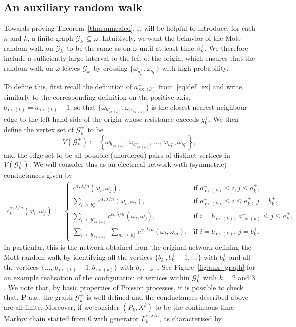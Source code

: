 \documentclass[10pt]{amsart}
\theoremstyle{definition}\newtheorem{defi}[theo]{Definition}\newtheorem{rema}[theo]{Remark}\newtheorem{exam}[theo]{Example}\newtheorem{exem}[theo]{Example}\newtheorem{nota}[theo]{Notation}
\newcommand{\clG}{\mathcal{G}}
\newcommand{\bfP}{\mathbf{P}}
\newcommand\ex{\operatorname{ex}}
\newcommand{\aat}[1]{a_{\ex(#1)}^-}
\newcommand{\bt}[1]{b_{\ex(#1)}^-}
\begin{document}
\subsection{An auxiliary random walk}\label{sec31}

Towards proving Theorem~\ref{thm:annealed}, it will be helpful to introduce, for each $n$ and $k$, a finite graph $\clG_k^+\subseteq\omega$. Intuitively, we want the behavior of the Mott random walk on $\clG_k^+$ to be the same as on $\omega$ until at least time $\beta_k^+$. We therefore include a sufficiently large interval to the left of the origin, which ensures that the random walk on $\omega$ leaves $\clG_k^+$ by crossing $\{\omega_{a_k^+},\omega_{b_k^+}\}$ with high probability.

To define this, first recall the definition of $\aat{k}$ from~\eqref{eq:def_ex} and write, similarly to the corresponding definition on the positive axis, $\bt{k}=\aat{k}-1$, so that $\{\omega_{\bt{k}},\omega_{\aat{k}}\}$ is the closest nearest-neighbour edge to the left-hand side of the origin whose resistance exceeds $g_k^+$. We then define the vertex set of $\clG_k^+$ to be
\[
V\left(\clG_k^+\right):=\left\{\omega_{\bt{k}},\omega_{\aat{k}},\,\dots,\,\omega_{a_k^+},\omega_{b_k^+}\right\},
\]
and the edge set to be all possible (unordered) pairs of distinct vertices in $V(\clG_k^+)$. We will consider this as an electrical network with (symmetric) conductances given by
\begin{align*}
c^{\alpha,\lambda/n}_k(\omega_i,\omega_j):=\left\{
\begin{array}{ll}
c^{\alpha,\lambda/n}\left(\omega_i,\omega_j\right), & \text{if }\aat{k}\leq i,j\leq a_k^+,\\
\sum_{l\,\geq\,b_k^+}c^{\alpha,\lambda/n}\left(\omega_i,\omega_l\right), & \text{if }\aat{k}\leq i\leq a_k^+,\:j=b_k^+,\\
\sum_{l\,\leq\,\bt{k}}c^{\alpha,\lambda/n}\left(\omega_l,\omega_j\right), & \text{if }i=\bt{k},\:\aat{k}\leq j\leq a_k^+,\\
\sum_{l\,\leq \,\bt{k}}\;\sum_{m\,\geq\,b_k^+}c^{\alpha,\lambda/n}(\omega_l,\omega_m), & \text{if }i=\bt{k},\:j=b_k^+.
\end{array}\right.
\end{align*}
In particular, this is the network obtained from the original network defining the Mott random walk by identifying all the vertices $\{b_k^+,b_k^++1,\,\dots\}$ with $b_k^+$ and all the vertices $\{\dots,\,\bt{k}-1,\bt{k}\}$ with $\bt{k}$. See Figure~\ref{fig:aux_graph} for an example realisation of the configuration of vertices within $\clG_k^+$ with $k=2$ and $3$. We note that, by basic properties of Poisson processes, it is possible to check that, $\bfP$-a.s., the graph $\clG_k^+$ is well-defined and the conductances described above are all finite. Moreover, if we consider $(P_k,X^k)$ to be the continuous time Markov chain started from 0 with generator $L_k^{\alpha,\lambda/n}$, as characterised by
\end{document}
